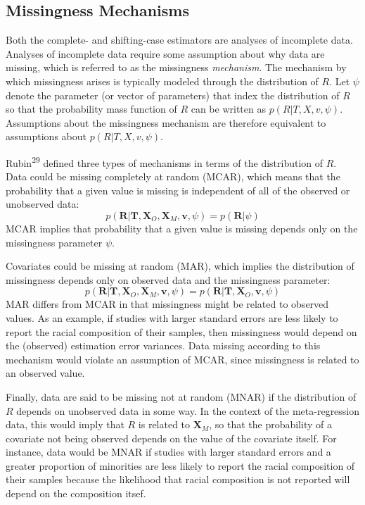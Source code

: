 \documentclass[
]{article}
\begin{document}
\hypertarget{missingness-mechanisms}{%
\subsection{Missingness Mechanisms}\label{missingness-mechanisms}}

Both the complete- and shifting-case estimators are analyses of incomplete data.
Analyses of incomplete data require some assumption about why data are missing, which is referred to as the missingness \emph{mechanism}.
The mechanism by which missingness arises is typically modeled through the distribution of \(R\).
Let \(\psi\) denote the parameter (or vector of parameters) that index the distribution of \(R\) so that the probability mass function of \(R\) can be written as \(p(R | T, X, v, \psi)\).
Assumptions about the missingness mechanism are therefore equivalent to assumptions about \(p(R | T, X, v, \psi)\).

Rubin\textsuperscript{29} defined three types of mechanisms in terms of the distribution of \(R\).
Data could be missing completely at random (MCAR), which means that the probability that a given value is missing is independent of all of the observed or unobserved data:
\[
  p(\mathbf{R} | \mathbf{T}, \mathbf{X}_O, \mathbf{X}_M, \mathbf{v}, \psi) = p(\mathbf{R} | \psi)
\]
MCAR implies that probability that a given value is missing depends only on the missingness parameter \(\psi\).

Covariates could be missing at random (MAR), which implies the distribution of missingness depends only on observed data and the missingness parameter:
\[
  p(\mathbf{R} | \mathbf{T}, \mathbf{X}_O, \mathbf{X}_M, \mathbf{v}, \psi) = 
  p(\mathbf{R} | \mathbf{T}, \mathbf{X}_O,\mathbf{v}, \psi)
\]
MAR differs from MCAR in that missingness might be related to observed values.
As an example, if studies with larger standard errors are less likely to report the racial composition of their samples, then missingness would depend on the (observed) estimation error variances.
Data missing according to this mechanism would violate an assumption of MCAR, since missingness is related to an observed value.

Finally, data are said to be missing not at random (MNAR) if the distribution of \(R\) depends on unobserved data in some way.
In the context of the meta-regression data, this would imply that \(R\) is related to \(\mathbf{X}_M\), so that the probability of a covariate not being observed depends on the value of the covariate itself.
For instance, data would be MNAR if studies with larger standard errors and a greater proportion of minorities are less likely to report the racial composition of their samples because the likelihood that racial composition is not reported will depend on the composition itsef.
\end{document}
